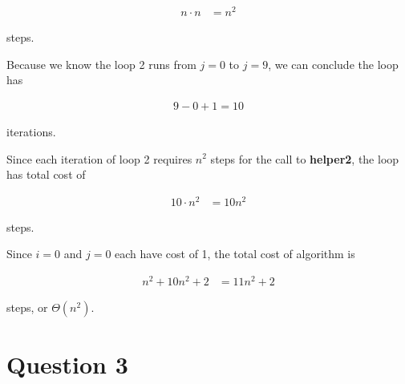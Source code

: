 \documentclass[12pt]{article}
\begin{document}
\begin{enumerate}[a.]
    \begin{align}
        n \cdot n &= n^2
    \end{align}

    steps.

    \bigskip

    Because we know the loop 2 runs from $j = 0$ to $j = 9$, we can conclude
    the loop has

    \begin{align}
        9 - 0 + 1 = 10
    \end{align}

    iterations.

    \bigskip

    Since each iteration of loop 2 requires $n^2$ steps for the call to
    \textbf{helper2}, the loop has total cost of

    \begin{align}
        10 \cdot n^2 &= 10n^2
    \end{align}

    steps.

    \bigskip

    Since $i = 0$ and $j = 0$ each have cost of 1, the total cost of algorithm
    is

    \begin{align}
        n^2 + 10n^2 + 2 &= 11n^2 + 2
    \end{align}

    steps, or $\Theta(n^2)$.

\end{enumerate}

\section*{Question 3}
\end{document}
